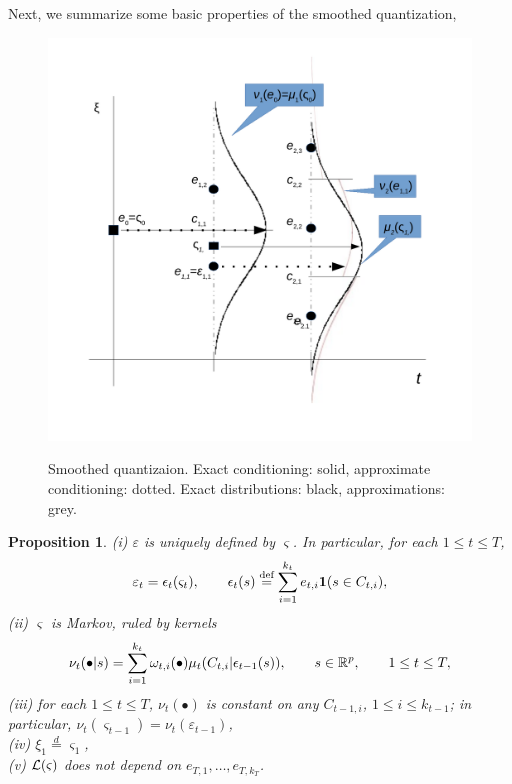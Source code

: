 \documentclass{article}              %
\newtheorem{proposition}{Proposition}
\begin{document}
\noindent Next, we summarize some basic properties of the smoothed quantization, 

\begin{figure}
\begin{center}
\includegraphics[scale=0.5]{illust}\label{fig:ilust}

\caption{Smoothed quantizaion. Exact conditioning: solid, approximate conditioning: dotted. Exact distributions: black, approximations: grey.}
\end{center}
\end{figure}

\begin{proposition}
\label{prop:vs}(i) $\varepsilon$ is uniquely defined by $\varsigma$.
In particular, for each $1\leq t\leq T$, 
\[
\varepsilon_{t}=\epsilon_{t}(\varsigma_{t}),\qquad\epsilon_{t}(s)\stackrel{\text{\rm def}}{=}\sum_{i=1}^{k_{t}}e_{t,i}\mathbf{1}(s\in C_{t,i}),
\]
(ii) $\varsigma$ is Markov, ruled by kernels 
\[
\nu_{t}(\bullet|s)=\sum_{i=1}^{k_{t}}\omega_{t,i}(\bullet)\mu_{t}(C_{t,i}|\epsilon_{t-1}(s)),\qquad s\in\mathbb{R}^p,\qquad  1\leq t\leq T,
\]
(iii) for each $1\leq t\leq T$, $\nu_{t}(\bullet)$ is constant on any $C_{t-1,i}$, $1\leq i\leq k_{t-1}$; in particular, $\nu_{t}(\varsigma_{t-1})=\nu_{t}(\varepsilon_{t-1})$,\\
(iv) $\xi_{1}\stackrel{d}{=}\varsigma_{1}$,\\
(v) $\mathcal{L}(\varsigma)$ does not depend on $e_{T,1},\dots,e_{T,k_T}$.
\end{proposition}
\end{document}
